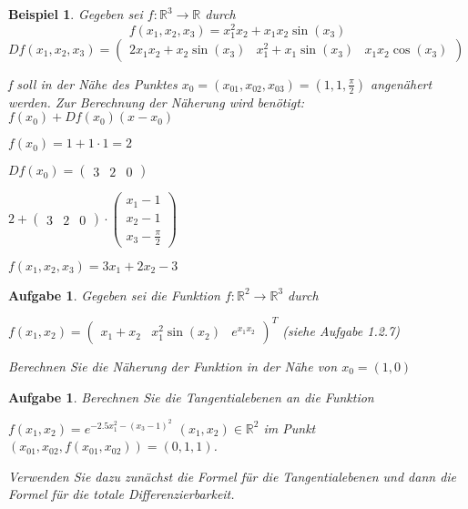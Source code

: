 \documentclass[12pt,a4paper]{scrreprt}
\newtheorem{beispiel}[defi]{Beispiel}
\newtheorem{aufg}[defi]{Aufgabe}
\begin{document}
\begin{beispiel}
	Gegeben sei $f:\mathbb{R}^3\to\mathbb{R}$ durch
	\[f(x_1,x_2,x_3)=x_1^2x_2+x_1x_2\sin(x_3)\]
	$Df(x_1,x_2,x_3)=\begin{pmatrix}
	2x_1x_2+x_2\sin(x_3) & x_1^2+x_1\sin(x_3) & x_1x_2\cos(x_3)
	\end{pmatrix}$
	
	f soll in der Nähe des Punktes $x_0=(x_{01},x_{02},x_{03})=(1,1,\frac{\pi}{2})$ angenähert werden. Zur Berechnung der Näherung wird benötigt: $f(x_0)+Df(x_0)(x-x_0)$
	
	$f(x_0)=1+1\cdot1=2$
	
	$Df(x_0)=\begin{pmatrix}3 & 2 & 0\end{pmatrix}$
	
	$2+\begin{pmatrix}3 & 2 & 0\end{pmatrix}\cdot\begin{pmatrix}
	x_1 - 1 \\
	x_2 - 1 \\
	x_3 - \frac{\pi}{2}
	\end{pmatrix}$
	
	$f(x_1,x_2,x_3)=3x_1+2x_2-3$
\end{beispiel}

\begin{aufg}
Gegeben sei die Funktion $f:\mathbb{R}^2\to\mathbb{R}^3$ durch 

$f(x_1,x_2)=\begin{pmatrix}x_1+x_2 & x_1^2\sin(x_2) & e^{x_1x_2}\end{pmatrix}^T$ (siehe Aufgabe 1.2.7)

	Berechnen Sie die Näherung der Funktion in der Nähe von $x_0=(1,0)$
\end{aufg}

\begin{aufg}
	Berechnen Sie die Tangentialebenen an die Funktion
	
	$f(x_1,x_2)=e^{-2.5x_1^2-{(x_3-1)}^2}$ $(x_1,x_2)\in\mathbb{R}^2$ im Punkt $(x_{01},x_{02},f(x_{01},x_{02}))=(0,1,1)$.

	Verwenden Sie dazu zunächst die Formel für die Tangentialebenen und dann die Formel für die totale Differenzierbarkeit.
\end{aufg}
\end{document}

